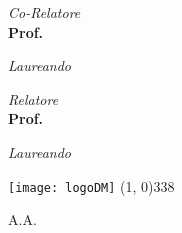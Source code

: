\begin{titlepage}
\begin{center}
{\begin{large}
    \begin{flushleft}
    \textit{Co-Relatore}\\ 
    \vspace{5pt} 
    \textbf{Prof. \myCoSupervisor}
    \end{flushleft}

    \vspace*{-4.23cm} 

    \begin{flushright}
    \textit{Laureando}\\ 
    \vspace{5pt} 
    \textbf{\myName}
    \end{flushright}
    \end{large}
}{
    \begin{large}
    \begin{flushleft}
    \textit{Relatore}\\ 
    \vspace{5pt} 
    \textbf{Prof. \mySupervisor}
    \end{flushleft}

    \vspace*{-2.36cm} 

    \begin{flushright}
    \textit{Laureando}\\ 
    \vspace{5pt} 
    \textbf{\myName}
    \end{flushright}
    \end{large}
}

\vfill
\texttt{[image: logoDM]}
\line(1, 0){338} \\
\begin{normalsize}
\textsc{A.A. \myAA}
\end{normalsize}

\end{center}
\end{titlepage}
